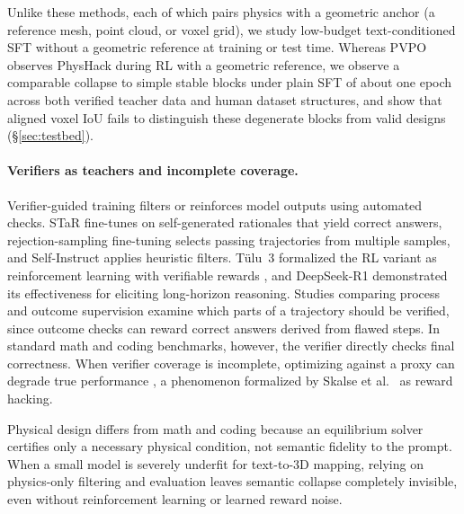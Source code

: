 \documentclass{article}
\begin{document}
Unlike these methods, each of which pairs physics with a geometric anchor (a reference mesh, point cloud, or voxel grid), we study low-budget text-conditioned SFT without a geometric reference at training or test time. Whereas PVPO observes PhysHack during RL with a geometric reference, we observe a comparable collapse to simple stable blocks under plain SFT of about one epoch across both verified teacher data and human dataset structures, and show that aligned voxel IoU fails to distinguish these degenerate blocks from valid designs (\S\ref{sec:testbed}).

\paragraph{Verifiers as teachers and incomplete coverage.}
Verifier-guided training filters or reinforces model outputs using automated checks. STaR \cite{zelikman2022star} fine-tunes on self-generated rationales that yield correct answers, rejection-sampling fine-tuning \cite{yuan2023rft} selects passing trajectories from multiple samples, and Self-Instruct \cite{wang2023selfinstruct} applies heuristic filters. T\"ulu~3 formalized the RL variant as reinforcement learning with verifiable rewards \cite{lambert2024tulu3}, and DeepSeek-R1 \cite{deepseekr1} demonstrated its effectiveness for eliciting long-horizon reasoning. Studies comparing process and outcome supervision \cite{uesato2022process,lightman2023verify} examine which parts of a trajectory should be verified, since outcome checks can reward correct answers derived from flawed steps. In standard math and coding benchmarks, however, the verifier directly checks final correctness. When verifier coverage is incomplete, optimizing against a proxy can degrade true performance \cite{gao2023overoptimization}, a phenomenon formalized by Skalse et al.\ \cite{skalse2022hacking} as reward hacking.

Physical design differs from math and coding because an equilibrium solver certifies only a necessary physical condition, not semantic fidelity to the prompt. When a small model is severely underfit for text-to-3D mapping, relying on physics-only filtering and evaluation leaves semantic collapse completely invisible, even without reinforcement learning or learned reward noise.
\end{document}
